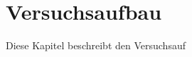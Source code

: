 \chapter{Versuchsaufbau}
\label{cha: Versuchsaufbau}

Diese Kapitel beschreibt den Versuchsauf








